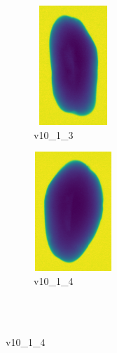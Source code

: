 \documentclass[11pt]{article}
\begin{document}
\begin{figure}
     \hfill
    \begin{subfigure}[b]{0.15\textwidth}
         \centering
         \includegraphics[width=3cm, height=4.5cm]{images/kartofler/v10_1_3_cut.png}
        \caption{v10\_1\_3}
         \label{fig:five over x}
     \end{subfigure}
     \hfill
    \begin{subfigure}[b]{0.15\textwidth}
         \centering
         \includegraphics[width=3cm, height=4.5cm]{images/kartofler/v10_1_4_cut.png}
        \caption{v10\_1\_4}
         \label{fig:five over x}
     \end{subfigure}
     
     
        \\ \\
        

\end{figure}
\end{document}
